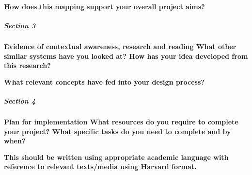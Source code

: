 \documentclass[]{article}
\begin{document}
    \textbf{How does this mapping support your overall project aims?}

\subparagraph[]{Section 3}

    \textbf{Evidence of contextual awareness, research and reading What other similar
    systems have you looked at? How has your idea developed from this research? }
    
    \textbf{What relevant concepts have fed into your design process?}

\subparagraph[]{Section 4}
    
    \textbf{Plan for implementation What resources do you require to complete your
    project? What specific tasks do you need to complete and by when?}

    \textbf{This should be written using appropriate academic language with reference
    to relevant texts/media using Harvard format.}



\end{document}
